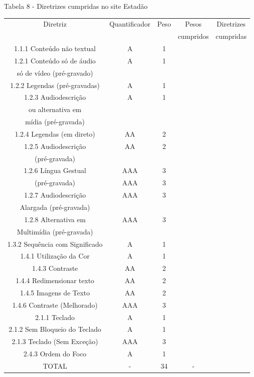 \documentclass[a4paper]{article}
\begin{document}
\begin{titlepage}
Tabela 8 - Diretrizes cumpridas no site Estadão\\[-1cm]
\begin{center}
	\fontsize{8pt}{8pt}\selectfont	
	\begin{longtable}{|c|c|c|c|c|}
		\hline
		Diretriz & Quantificador & Peso & Pesos & Diretrizes\\
		& & & cumpridos & cumpridas\\
		\hline
		1.1.1 Conteúdo não textual & A & 1 & & \\
		\hline
		1.2.1 Conteúdo só de áudio & A & 1 & & \\
		só de vídeo (pré-gravado) & & & & \\
		\hline
		1.2.2 Legendas (pré-gravadas) & A & 1 & & \\
		\hline
		1.2.3 Audiodescrição & A & 1 & & \\
		ou alternativa em & & & & \\
		mídia (pré-gravada) & & & & \\
		\hline
		1.2.4 Legendas (em direto) & AA & 2 & & \\
		\hline
		1.2.5 Audiodescrição & AA & 2 & & \\
		(pré-gravada) & & & & \\
		\hline
		1.2.6 Língua Gestual & AAA & 3 & & \\
		(pré-gravada) & AAA & 3 & & \\
		\hline
		1.2.7 Audiodescrição & AAA & 3 & & \\
		Alargada (pré-gravada) & & & & \\
		\hline
		1.2.8 Alternativa em & AAA & 3 & & \\
		Multimídia (pré-gravada) & & & & \\
		\hline
		1.3.2 Sequência com Significado & A & 1 & & \\
		\hline
		1.4.1 Utilização da Cor & A & 1 & & \\
		\hline
		1.4.3 Contraste & AA & 2 & & \\
		\hline
		1.4.4 Redimensionar texto & AA & 2 & & \\
		\hline
		1.4.5 Imagens de Texto & AA & 2 & & \\
		\hline
		1.4.6 Contraste (Melhorado) & AAA & 3 & & \\
		\hline
		2.1.1 Teclado & A & 1 & & \\
		\hline
		2.1.2 Sem Bloqueio do Teclado & A & 1 & & \\
		\hline
		2.1.3 Teclado (Sem Exceção) & AAA & 3 & & \\
		\hline
		2.4.3 Ordem do Foco & A & 1 & & \\
		\hline
		TOTAL & - & 34 & - & \\
		\hline
	\end{longtable}
\end{center}


\end{titlepage}
\end{document}

